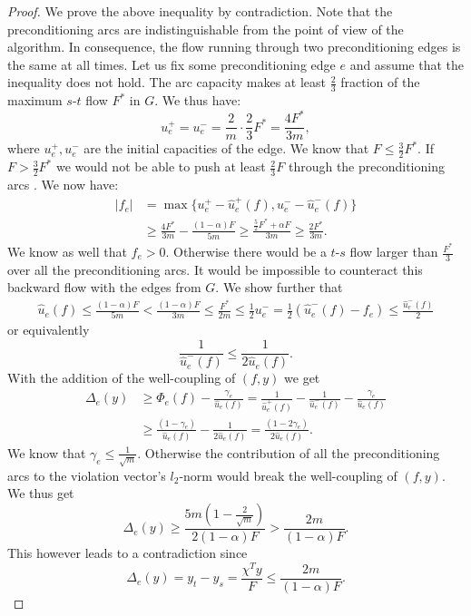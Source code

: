 \begin{proof}
We prove the above inequality by contradiction. Note that the preconditioning arcs are indistinguishable from the point of view of the algorithm. In consequence, the flow running through two preconditioning edges is the same at all times. Let us fix some preconditioning edge $e$ and assume that the inequality does not hold.
The arc capacity makes at least $\frac{2}{3}$ fraction of the maximum $s$-$t$ flow $F^*$ in $G$. We thus have:
\[
u_e^+ = u_e^- = \frac{2}{m}\cdot\frac{2}{3}F^* = \frac{4F^*}{3m},
\]
where $u_e^+, u_e^-$ are the initial capacities of the edge. We know that $F \le \frac{3}{2}F^*$. If $F > \frac{3}{2}F^*$ we would not be able to push at least $\frac{2}{3}F$ through the preconditioning arcs . We now have:
\[
\begin{split}
|f_e|
&= \max\{u_e^+-\hat u_e^+(f),u_e^--\hat u_e^-(f)\} \\
&\ge \frac{4F^*}{3m}-\frac{(1-\alpha)F}{5m} \ge \frac{\frac{5}{2}F^*    +\alpha F}{3m} \ge \frac{2F^*}{3m}.
\end{split}
\]
We know as well that $f_e>0$. Otherwise there would be a $t$-$s$ flow larger than $\frac{F^*}{3}$ over all the preconditioning arcs. It would be impossible to counteract this backward flow with the edges from $G$.
We show further that
\[\begin{split}
\hat u_e(f) \le \frac{(1-\alpha)F}{5m} < \frac{(1-\alpha)F}{3m} \le \frac{F^*}{2m} 
\le \frac{1}{2}u_e^- = \frac{1}{2}(\hat u_e^-(f)-f_e) \le \frac{\hat u_e^-(f)}{2}
\end{split}
\]
or equivalently
\[
\frac{1}{\hat u_e^-(f)} \le \frac{1}{2\hat u_e(f)}.
\]
With the addition of the well-coupling of $(f,y)$ we get
\[
\begin{split}
\Delta_e(y)
&\ge \Phi_e(f)-\frac{\gamma_e}{\hat u_e(f)} = \frac{1}{\hat u_e^+(f)}-\frac{1}{\hat u_e^-(f)}-\frac{\gamma_e}{\hat u_e(f)} \\
&\ge \frac{(1-\gamma_e)}{\hat u_e(f)}-\frac{1}{2\hat u_e(f)} = \frac{(1-2\gamma_e)}{2\hat u_e(f)}.
\end{split}
\]
We know that $\gamma_e \le \frac{1}{\sqrt{m}}$. Otherwise the contribution of all the preconditioning arcs to the violation vector's $l_2$-norm would break the well-coupling of $(f,y)$. We thus get
\[
 \Delta_e(y) \ge \frac{5m(1-\frac{2}{\sqrt{m}})}{2(1-\alpha)F} > \frac{2m}{(1-\alpha)F}.
\]
This however leads to a contradiction since
\[
\Delta_e(y) = y_t-y_s = \frac{\chi^Ty}{F} \le \frac{2m}{(1-\alpha)F}.
\]
\end{proof}

